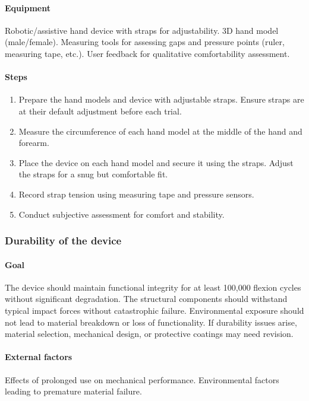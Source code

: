 \documentclass{article}
\begin{document}
\paragraph{Equipment} Robotic/assistive hand device with straps for adjustability. 3D hand model (male/female). Measuring tools for assessing gaps and pressure points (ruler, measuring tape, etc.). User feedback for qualitative comfortability assessment.

\paragraph{Steps}
\begin{enumerate}
    \item Prepare the hand models and device with adjustable straps. Ensure straps are at their default adjustment before each trial.
    \item Measure the circumference of each hand model at the middle of the hand and forearm.
    \item Place the device on each hand model and secure it using the straps. Adjust the straps for a snug but comfortable fit.
    \item Record strap tension using measuring tape and pressure sensors.
    \item Conduct subjective assessment for comfort and stability.
\end{enumerate}

\subsubsection{Durability of the device}

\paragraph{Goal} The device should maintain functional integrity for at least 100,000 flexion cycles without significant degradation. The structural components should withstand typical impact forces without catastrophic failure. Environmental exposure should not lead to material breakdown or loss of functionality. If durability issues arise, material selection, mechanical design, or protective coatings may need revision.

\paragraph{External factors} Effects of prolonged use on mechanical performance. Environmental factors leading to premature material failure.
\end{document}
